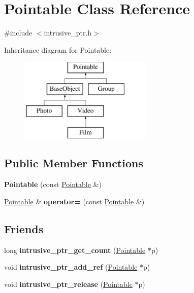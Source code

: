\hypertarget{classPointable}{\section{Pointable Class Reference}
\label{classPointable}
}


{\ttfamily \#include $<$intrusive\+\_\+ptr.\+h$>$}

Inheritance diagram for Pointable\+:\begin{figure}[H]
\begin{center}
\leavevmode
\includegraphics[height=4.000000cm]{classPointable}
\end{center}
\end{figure}
\subsection*{Public Member Functions}
\begin{DoxyCompactItemize}
\item 
\hypertarget{classPointable_adc4da364054bdd4c4a9624f5dc190c8a}{{\bfseries Pointable} (const \hyperlink{classPointable}{Pointable} \&)}\label{classPointable_adc4da364054bdd4c4a9624f5dc190c8a}

\item 
\hypertarget{classPointable_a8a7eb6956905e6e320ce97fa24f03b59}{\hyperlink{classPointable}{Pointable} \& {\bfseries operator=} (const \hyperlink{classPointable}{Pointable} \&)}\label{classPointable_a8a7eb6956905e6e320ce97fa24f03b59}

\end{DoxyCompactItemize}
\subsection*{Friends}
\begin{DoxyCompactItemize}
\item 
\hypertarget{classPointable_a9c08ce04af1d8cd2697b64990c51a5f4}{long {\bfseries intrusive\+\_\+ptr\+\_\+get\+\_\+count} (\hyperlink{classPointable}{Pointable} $\ast$p)}\label{classPointable_a9c08ce04af1d8cd2697b64990c51a5f4}

\item 
\hypertarget{classPointable_a16ec5f964af06a93d6c7cfe0979ff672}{void {\bfseries intrusive\+\_\+ptr\+\_\+add\+\_\+ref} (\hyperlink{classPointable}{Pointable} $\ast$p)}\label{classPointable_a16ec5f964af06a93d6c7cfe0979ff672}

\item 
\hypertarget{classPointable_aee25e5a73726af47eb078e2087eaee57}{void {\bfseries intrusive\+\_\+ptr\+\_\+release} (\hyperlink{classPointable}{Pointable} $\ast$p)}\label{classPointable_aee25e5a73726af47eb078e2087eaee57}

\end{DoxyCompactItemize}


